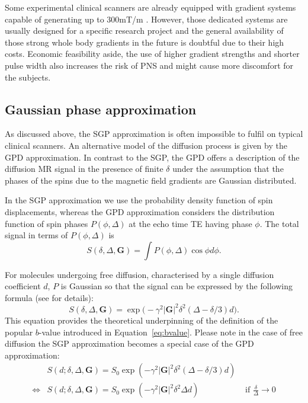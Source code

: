 Some experimental clinical scanners are already equipped with gradient systems capable of generating up to 300mT/m \citep{Toga:2012}. However, those dedicated systems are usually designed for a specific research project and the general availability of those strong whole body gradients in the future is doubtful due to their high costs. Economic feasibility aside, the use of higher gradient strengths and shorter pulse width also increases the risk of \gls{PNS} and might cause more discomfort for the subjects. 

\subsection{Gaussian phase approximation}
\label{sec:chapter 2GPD}
As discussed above, the SGP approximation is often impossible to fulfil on typical clinical scanners. An alternative model of the diffusion process is given by the \gls{GPD} approximation. In contrast to the \gls{SGP}, the \gls{GPD} offers a description of the diffusion MR signal in the presence of finite $\delta$ under the assumption that the phases of the spins due to the magnetic field gradients are Gaussian distributed.

In the SGP approximation we use the probability density function of spin displacements, whereas the GPD approximation considers the distribution function of spin phases $P(\phi,\Delta)$ at the echo time TE  having phase $\phi$. The total signal in terms of $P(\phi,\Delta)$ is
\begin{equation}
S(\delta,\Delta,\textbf{G})  = \int P(\phi,\Delta)\cos\phi d\phi.
\end{equation}

For molecules undergoing free diffusion, characterised by a single diffusion coefficient $d$,  $P$ is Gaussian so that the signal can be expressed by the following formula (see \citet{Price:1998} for details):
\begin{equation}
S(\delta,\Delta,\textbf{G})  =  \exp\Big(- \gamma^{2} |\textbf{G}|^{2} \delta^{2} (\Delta - \delta/3) d\Big).
\label{freediff}
\end{equation}
This equation provides the theoretical underpinning of the definition of the popular $b$-value introduced in Equation~\ref{eq:bvalue}. Please note in the case of free diffusion the SGP approximation becomes a special case of the \gls{GPD} approximation:
\begin{align}
				   & S(d;\delta,\Delta,\textbf{G})   =  S_0\exp(-\gamma^{2} |\textbf{G}|^{2} \delta^{2} (\Delta - \delta/3) d) & \\ 
\Leftrightarrow & S(d;\delta,\Delta,\textbf{G})   =  S_0\exp(-\gamma^{2} |\textbf{G}|^{2} \delta^{2} \Delta d)	& \mbox{ if }\frac{\delta}{\Delta}\to 0 
\label{eq: chapter2 GPD vs SGP free diff}
\end{align}
